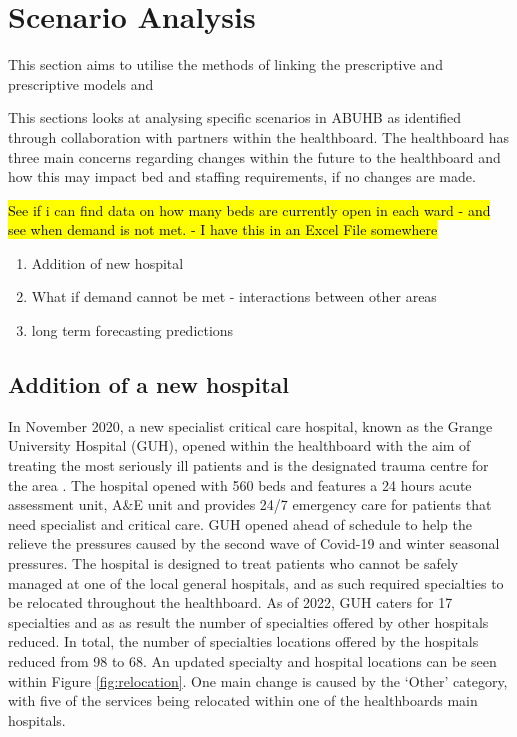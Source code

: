 \documentclass[../thesis.tex]{subfiles}
\begin{document}
\newpage



\section{Scenario Analysis}
This section aims to utilise the methods of linking the prescriptive and prescriptive models and 


This sections looks at analysing specific scenarios in ABUHB as identified through collaboration with partners within the healthboard. The healthboard has three main concerns regarding changes within the future to the healthboard and how this may impact bed and staffing requirements, if no changes are made.

\hl{See if i can find data on how many beds are currently open in each ward - and see when demand is not met. - I have this in an Excel File somewhere}

\begin{enumerate}
    \item Addition of new hospital
    \item What if demand cannot be met - interactions between other areas 
    \item long term forecasting predictions
\end{enumerate}


\subsection{Addition of a new hospital}
In November 2020, a new specialist critical care hospital, known as the Grange University Hospital (GUH), opened within the healthboard with the aim of treating the most seriously ill patients and is the designated trauma centre for the area \cite{NHSWalesa}. The hospital opened with 560 beds and features a 24 hours acute assessment unit, A\&E unit and provides 24/7 emergency care for patients that need specialist and critical care. GUH opened ahead of schedule to help the relieve the pressures caused by the second wave of Covid-19 and winter seasonal pressures. The hospital is designed to treat patients who cannot be safely managed at one of the local general hospitals, and as such required specialties to be relocated throughout the healthboard. As of 2022, GUH caters for 17 specialties and as as result the number of specialties offered by other hospitals reduced. In total, the number of specialties locations offered by the hospitals reduced from 98 to 68. An updated specialty and hospital locations can be seen within Figure \ref{fig:relocation}. One main change is caused by the `Other' category, with five of the services being relocated within one of the healthboards main hospitals.
\end{document}
